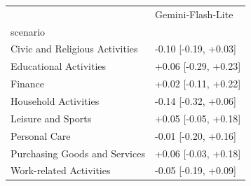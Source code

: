\begin{tabular}{ll}
\toprule
 & Gemini-Flash-Lite \\
scenario &  \\
\midrule
Civic and Religious Activities & -0.10 [-0.19, +0.03] \\
Educational Activities & +0.06 [-0.29, +0.23] \\
Finance & +0.02 [-0.11, +0.22] \\
Household Activities & -0.14 [-0.32, +0.06] \\
Leisure and Sports & +0.05 [-0.05, +0.18] \\
Personal Care & -0.01 [-0.20, +0.16] \\
Purchasing Goods and Services & +0.06 [-0.03, +0.18] \\
Work-related Activities & -0.05 [-0.19, +0.09] \\
\bottomrule
\end{tabular}
